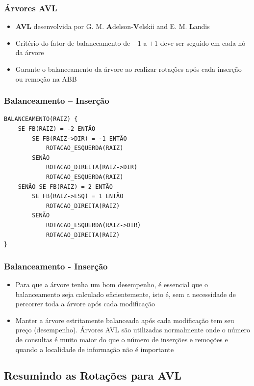 \begin{frame}
    \frametitle{Árvores AVL}
    
    \begin{itemize}
    \item \textbf{AVL} desenvolvida por G. M. \textbf{A}delson-\textbf{V}elskii and E. M. \textbf{L}andis
    
    \item Critério do fator de balanceamento de $-1$ a $+1$ deve ser seguido em cada
    nó da árvore
    
    \item Garante o balanceamento da árvore ao realizar rotações após cada inserção ou remoção na ABB
    \end{itemize}
\end{frame}

\begin{frame}[fragile]
\frametitle{Balanceamento -- Inserção}
\begin{verbatim}
BALANCEAMENTO(RAIZ) {
    SE FB(RAIZ) = -2 ENTÃO
        SE FB(RAIZ->DIR) = -1 ENTÃO
            ROTACAO_ESQUERDA(RAIZ)
        SENÃO
            ROTACAO_DIREITA(RAIZ->DIR)
            ROTACAO_ESQUERDA(RAIZ)
    SENÃO SE FB(RAIZ) = 2 ENTÃO
        SE FB(RAIZ->ESQ) = 1 ENTÃO
            ROTACAO_DIREITA(RAIZ)
        SENÃO
            ROTACAO_ESQUERDA(RAIZ->DIR)
            ROTACAO_DIREITA(RAIZ)
}
\end{verbatim}
\end{frame}

\begin{frame}[fragile]
\frametitle{Balanceamento - Inserção}

\begin{itemize}
\item Para que a árvore tenha um bom desempenho, é essencial que o balanceamento seja
calculado eficientemente, isto é, sem a necessidade de percorrer toda a árvore após cada
modificação
\item Manter a árvore estritamente balanceada após cada modificação tem seu preço (desempenho).
Árvores AVL são utilizadas normalmente onde o número de consultas é muito maior do que o número de inserções
e remoções e quando a localidade de informação não é importante
\end{itemize}
\end{frame}

\subsection{Resumindo as Rotações para AVL}

